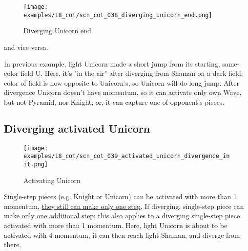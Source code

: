 \clearpage %

\vspace*{-2.1\baselineskip}
\noindent
\begin{figure}[!h]
\texttt{[image: examples/18\_cot/scn\_cot\_038\_diverging\_unicorn\_end.png]}
\vspace*{-1.3\baselineskip}
\caption{Diverging Unicorn end}
\label{fig:scn_cot_038_diverging_unicorn_end}
\end{figure}

\vspace*{-0.4\baselineskip}
\noindent
and vice versa.

In previous example, light Unicorn made a short jump from its starting, same-color
field U. Here, it's "in the air" after diverging from Shaman on a dark field; color
of field is now opposite to Unicorn's, so Unicorn will do long jump.
After divergence Unicorn doesn't have momentum, so it can activate only own Wave,
but not Pyramid, nor Knight; or, it can capture one of opponent's pieces.

\clearpage %

\subsection*{Diverging activated Unicorn}
\label{sec:Conquest of Tlalocan/Divergence/Diverging activated Unicorn}

\vspace*{-1.4\baselineskip}
\noindent
\begin{figure}[!h]
\texttt{[image: examples/18\_cot/scn\_cot\_039\_activated\_unicorn\_divergence\_init.png]}
\vspace*{-1.3\baselineskip}
\caption{Activating Unicorn}
\label{fig:scn_cot_039_activated_unicorn_divergence_init}
\end{figure}

\vspace*{-0.5\baselineskip}
Single-step pieces (e.g. Knight or Unicorn) can be activated with more than 1 momentum,
\hyperref[fig:scn_mv_33_single_step_piece_momentum]{they still can make only one step}.
If diverging, single-step piece can make
\hyperref[fig:scn_cot_037_diverging_unicorn_init]{only one additional step}; this also
applies to a diverging single-step piece activated with more than 1 momentum. \newline
\indent
Here, light Unicorn is about to be activated with 4 momentum, it can then reach light
Shaman, and diverge from there.

